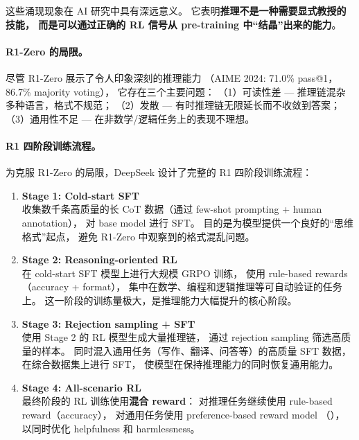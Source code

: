 \noindent
这些涌现现象在 AI 研究中具有深远意义。
它表明\textbf{推理不是一种需要显式教授的技能，
而是可以通过正确的 RL 信号从 pre-training 中``结晶''出来的能力}。

\paragraph{R1-Zero 的局限。}
尽管 R1-Zero 展示了令人印象深刻的推理能力
（AIME 2024: 71.0\% pass@1，86.7\% majority voting），
它存在三个主要问题：
（1）可读性差 --- 推理链混杂多种语言，格式不规范；
（2）发散 --- 有时推理链无限延长而不收敛到答案；
（3）通用性不足 --- 在非数学/逻辑任务上的表现不理想。

\paragraph{R1 四阶段训练流程。}
为克服 R1-Zero 的局限，DeepSeek 设计了完整的 R1 四阶段训练流程：

\begin{enumerate}[leftmargin=2em]
  \item \textbf{Stage 1: Cold-start SFT}\\
    收集数千条高质量的长 CoT 数据（通过 few-shot prompting + human annotation），
    对 base model 进行 SFT。
    目的是为模型提供一个良好的``思维格式''起点，
    避免 R1-Zero 中观察到的格式混乱问题。

  \item \textbf{Stage 2: Reasoning-oriented RL}\\
    在 cold-start SFT 模型上进行大规模 GRPO 训练，
    使用 rule-based rewards（accuracy + format），
    集中在数学、编程和逻辑推理等可自动验证的任务上。
    这一阶段的训练量极大，是推理能力大幅提升的核心阶段。

  \item \textbf{Stage 3: Rejection sampling + SFT}\\
    使用 Stage 2 的 RL 模型生成大量推理链，
    通过 rejection sampling 筛选高质量的样本。
    同时混入通用任务（写作、翻译、问答等）的高质量 SFT 数据，
    在综合数据集上进行 SFT，
    使模型在保持推理能力的同时恢复通用能力。

  \item \textbf{Stage 4: All-scenario RL}\\
    最终阶段的 RL 训练使用\textbf{混合 reward}：
    对推理任务继续使用 rule-based reward（accuracy），
    对通用任务使用 preference-based reward model
    （），
    以同时优化 helpfulness 和 harmlessness。
\end{enumerate}

